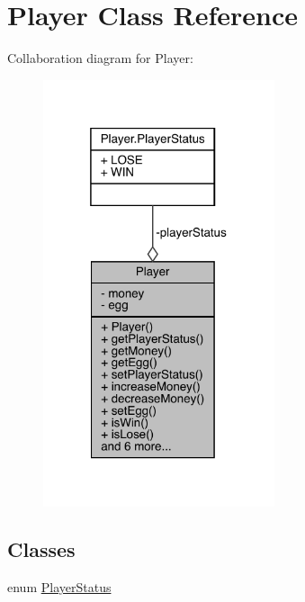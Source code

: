 \hypertarget{class_player}{}\section{Player Class Reference}
\label{class_player}


Collaboration diagram for Player\+:
\nopagebreak
\begin{figure}[H]
\begin{center}
\leavevmode
\includegraphics[width=193pt]{class_player__coll__graph}
\end{center}
\end{figure}
\subsection*{Classes}
\begin{DoxyCompactItemize}
\item 
enum \mbox{\hyperlink{enum_player_1_1_player_status}{Player\+Status}}
\end{DoxyCompactItemize}
